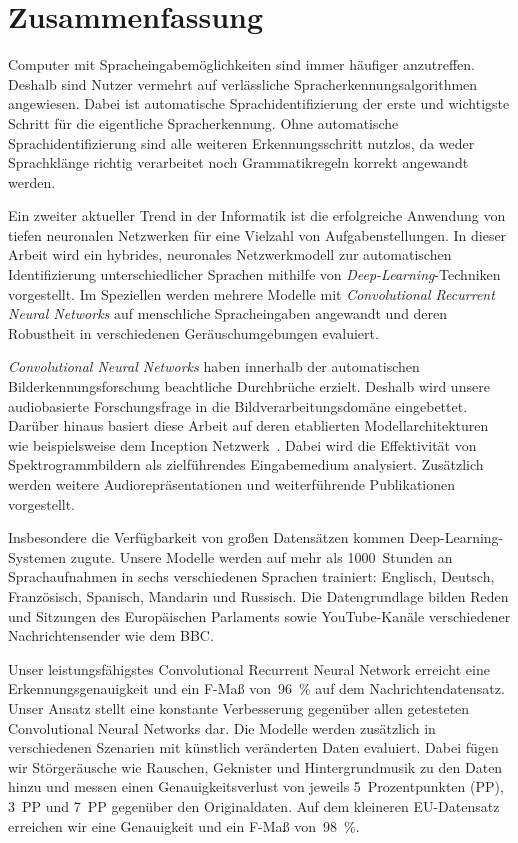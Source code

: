\section*{\LARGE Zusammenfassung}
Computer mit Spracheingabemöglichkeiten sind immer häufiger anzutreffen. Deshalb sind Nutzer vermehrt auf verlässliche Spracherkennungsalgorithmen angewiesen. Dabei ist automatische Sprachidentifizierung der erste und wichtigste Schritt für die eigentliche Spracherkennung. Ohne automatische Sprachidentifizierung sind alle weiteren Erkennungsschritt nutzlos, da weder Sprachklänge richtig verarbeitet noch Grammatikregeln korrekt angewandt werden.

Ein zweiter aktueller Trend in der Informatik ist die erfolgreiche Anwendung von tiefen neuronalen Netzwerken für eine Vielzahl von Aufgabenstellungen. In dieser Arbeit wird ein hybrides, neuronales Netzwerkmodell zur automatischen Identifizierung unterschiedlicher Sprachen mithilfe von \emph{Deep-Learning}-Techniken vorgestellt. Im Speziellen werden mehrere Modelle mit \emph{Convolutional Recurrent Neural Networks} auf menschliche Spracheingaben angewandt und deren Robustheit in verschiedenen Geräuschumgebungen evaluiert.

\emph{Convolutional Neural Networks} haben innerhalb der automatischen Bilderkennungsforschung beachtliche Durchbrüche erzielt. Deshalb wird unsere audiobasierte Forschungsfrage in die Bildverarbeitungsdomäne eingebettet. Darüber hinaus basiert diese Arbeit auf deren etablierten Modellarchitekturen wie beispielsweise dem Inception Netzwerk~\cite{szegedy2015going}. Dabei wird die Effektivität von Spektrogrammbildern als zielführendes Eingabemedium analysiert. Zusätzlich werden weitere Audiorepräsentationen und weiterführende Publikationen vorgestellt.

Insbesondere die Verfügbarkeit von großen Datensätzen kommen Deep-Learning-Systemen zugute. Unsere Modelle werden auf mehr als \num{1000}~Stunden an Sprachaufnahmen in sechs verschiedenen Sprachen trainiert: Englisch, Deutsch, Französisch, Spanisch, Mandarin und Russisch. Die Datengrundlage bilden Reden und Sitzungen des Europäischen Parlaments sowie YouTube-Kanäle verschiedener Nachrichtensender wie dem BBC.

Unser leistungsfähigstes Convolutional Recurrent Neural Network erreicht eine Erkennungsgenauigkeit und ein F-Maß von~\SI{96}{\percent} auf dem Nachrichtendatensatz. Unser Ansatz stellt eine konstante Verbesserung gegenüber allen getesteten Convolutional Neural Networks dar. Die Modelle werden zusätzlich in verschiedenen Szenarien mit künstlich veränderten Daten evaluiert. Dabei fügen wir Störgeräusche wie Rauschen, Geknister und Hintergrundmusik zu den Daten hinzu und messen einen Genauigkeitsverlust von jeweils \num{5}~Prozentpunkten (PP), \num{3}~PP und \num{7}~PP gegenüber den Originaldaten. Auf dem kleineren EU-Datensatz erreichen wir eine Genauigkeit und ein F-Maß von~\SI{98}{\percent}.
